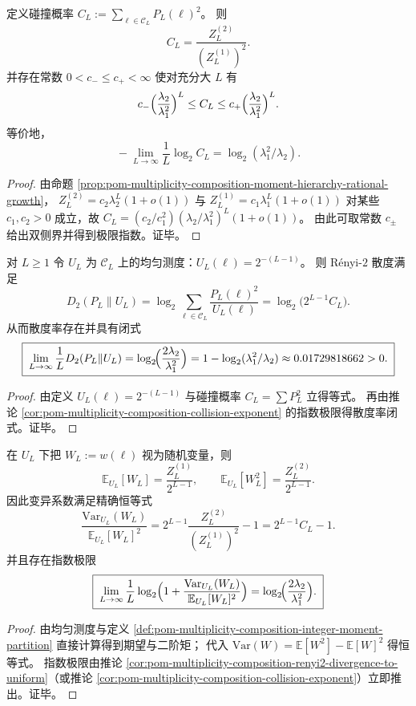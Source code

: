\begin{corollary}[碰撞概率的指数律与碰撞指数]\label{cor:pom-multiplicity-composition-collision-exponent}
定义碰撞概率
\(
C_L:=\sum_{\boldsymbol{\ell}\in\mathcal{C}_L}P_L(\boldsymbol{\ell})^2
\)。
则
\[
\boxed{\;C_L=\frac{Z_L^{(2)}}{(Z_L^{(1)})^2}.\;}
\]
并存在常数 \(0<c_-\le c_+<\infty\) 使对充分大 \(L\) 有
\[
c_-\Bigl(\frac{\lambda_2}{\lambda_1^2}\Bigr)^L
\le C_L\le
c_+\Bigl(\frac{\lambda_2}{\lambda_1^2}\Bigr)^L.
\]
等价地，
\[
\boxed{\;-\lim_{L\to\infty}\frac{1}{L}\log_2 C_L=\log_2(\lambda_1^2/\lambda_2).\;}
\]
\end{corollary}
\begin{proof}
由命题 \ref{prop:pom-multiplicity-composition-moment-hierarchy-rational-growth}，
\(
Z_L^{(2)}=c_2\lambda_2^L(1+o(1))
\)
与
\(
Z_L^{(1)}=c_1\lambda_1^L(1+o(1))
\)
对某些 \(c_1,c_2>0\) 成立，故
\(
C_L=(c_2/c_1^2)(\lambda_2/\lambda_1^2)^L(1+o(1))
\)。
由此可取常数 \(c_\pm\) 给出双侧界并得到极限指数。证毕。
\end{proof}

\begin{corollary}\label{cor:pom-multiplicity-composition-renyi2-divergence-to-uniform}
对 \(L\ge 1\) 令 \(U_L\) 为 \(\mathcal{C}_L\) 上的均匀测度：\(U_L(\boldsymbol{\ell})=2^{-(L-1)}\)。
则 Rényi-\(2\) 散度满足
\[
D_2(P_L\|U_L)
=\log_2\sum_{\boldsymbol{\ell}\in\mathcal{C}_L}\frac{P_L(\boldsymbol{\ell})^2}{U_L(\boldsymbol{\ell})}
=\log_2\bigl(2^{L-1}C_L\bigr).
\]
从而散度率存在并具有闭式
\[
\boxed{\;
\lim_{L\to\infty}\frac{1}{L}D_2(P_L\|U_L)
=\log_2\!\Bigl(\frac{2\lambda_2}{\lambda_1^2}\Bigr)
=1-\log_2(\lambda_1^2/\lambda_2)\approx 0.01729818662>0.\;}
\]
\end{corollary}
\begin{proof}
由定义 \(U_L(\boldsymbol{\ell})=2^{-(L-1)}\) 与碰撞概率 \(C_L=\sum P_L^2\) 立得等式。
再由推论 \ref{cor:pom-multiplicity-composition-collision-exponent} 的指数极限得散度率闭式。证毕。
\end{proof}

\begin{corollary}[均匀分解下多重度的方差爆炸率]\label{cor:pom-multiplicity-composition-uniform-variance-explosion}
在 \(U_L\) 下把 \(W_L:=w(\boldsymbol{\ell})\) 视为随机变量，则
\[
\mathbb{E}_{U_L}[W_L]=\frac{Z_L^{(1)}}{2^{L-1}},
\qquad
\mathbb{E}_{U_L}[W_L^2]=\frac{Z_L^{(2)}}{2^{L-1}}.
\]
因此变异系数满足精确恒等式
\[
\boxed{\;
\frac{\mathrm{Var}_{U_L}(W_L)}{\mathbb{E}_{U_L}[W_L]^2}
=2^{L-1}\frac{Z_L^{(2)}}{(Z_L^{(1)})^2}-1
=2^{L-1}C_L-1.\;}
\]
并且存在指数极限
\[
\boxed{\;
\lim_{L\to\infty}\frac{1}{L}\log_2\Bigl(1+\frac{\mathrm{Var}_{U_L}(W_L)}{\mathbb{E}_{U_L}[W_L]^2}\Bigr)
=\log_2\!\Bigl(\frac{2\lambda_2}{\lambda_1^2}\Bigr).\;}
\]
\end{corollary}
\begin{proof}
由均匀测度与定义 \ref{def:pom-multiplicity-composition-integer-moment-partition} 直接计算得到期望与二阶矩；
代入 \(\mathrm{Var}(W)=\mathbb{E}[W^2]-\mathbb{E}[W]^2\) 得恒等式。
指数极限由推论 \ref{cor:pom-multiplicity-composition-renyi2-divergence-to-uniform}（或推论 \ref{cor:pom-multiplicity-composition-collision-exponent}）立即推出。证毕。
\end{proof}

